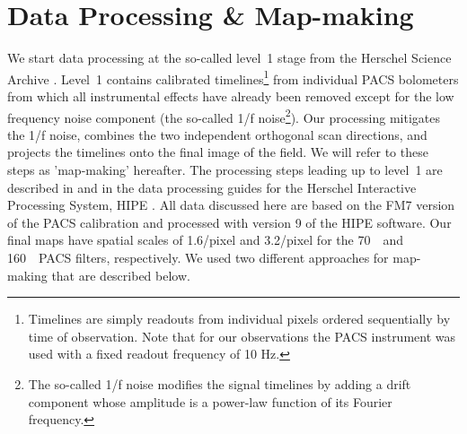 \documentclass[manuscript]{aastex61}
\begin{document}
\section{Data Processing \& Map-making}
\label{sec:dp}
\par
We start data processing at the so-called level~1 stage from the Herschel Science Archive \citep{pacspipeline}.  Level~1 contains calibrated timelines\footnote{Timelines are simply readouts from individual pixels ordered sequentially by time of observation.  Note that for our observations the PACS instrument was used with a fixed readout frequency of 10 Hz.} from individual PACS bolometers from which all instrumental effects have already been removed except for the low frequency noise component (the so-called 1/f noise\footnote{The so-called 1/f noise modifies the signal timelines by adding a drift component whose amplitude is a power-law function of its Fourier frequency.}).  Our processing mitigates the 1/f noise, combines the two independent orthogonal scan directions, and projects the timelines onto the final image of the field.  We will refer to these steps as 'map-making' hereafter.  The processing steps leading up to level~1 are described in \citet{pacs} and in the data processing guides for the Herschel Interactive Processing System, HIPE \cite{hipe}.  All data discussed here are based on the FM7 version of the PACS calibration \citep{pacscal} and processed with version 9 of the HIPE software.  Our final maps have spatial scales of 1.6\arcsec/pixel and 3.2\arcsec/pixel for the 70~\micron\ and 160~\micron\ PACS filters, respectively.  We used two different approaches for map-making that are described below.
\end{document}
